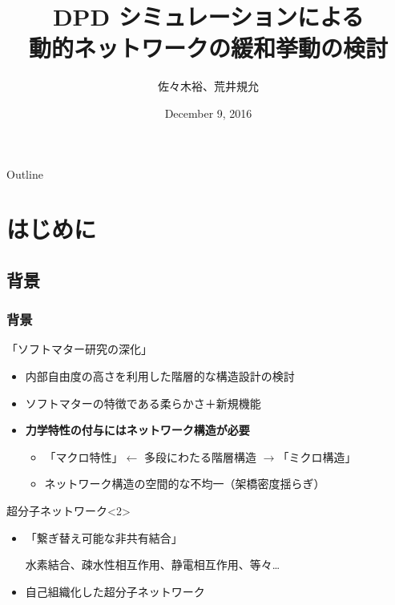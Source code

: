 \documentclass[12pt, dvipdfmx]{beamer}
\title
[DPD シミュレーションによる動的ネットワークの緩和挙動の検討]
{DPD シミュレーションによる\\動的ネットワークの緩和挙動の検討}
\author[東亞合成 佐々木 近畿大学 荒井]{佐々木裕、荒井規允}
\institute[東亞合成。近畿大学]{東亞合成、近畿大学}
\date{December 9, 2016}
\begin{document}
\begin{frame}\frametitle{}
	\titlepage
\end{frame}

\section*{}
%
\begin{frame}
{Outline}
	\tableofcontents
\end{frame}

\section{はじめに}

\subsection{背景}
\begin{frame}
\frametitle{背景}

\begin{block}{「ソフトマター研究の深化」}
	\begin{itemize}
	\item
	内部自由度の高さを利用した階層的な構造設計の検討
	\item
	ソフトマターの特徴である柔らかさ＋新規機能
	\item
	{\bf 力学特性の付与には\alert{ネットワーク構造}が必要}
		\begin{itemize}
		\item
		「マクロ特性」$\leftarrow$ 多段にわたる階層構造 $\rightarrow$「ミクロ構造」
		\item
		ネットワーク構造の空間的な不均一（架橋密度揺らぎ）
		\end{itemize}
	\end{itemize}
\end{block}

\begin{exampleblock}{超分子ネットワーク}<2>
	\begin{itemize}
	\item
	「繋ぎ替え可能な非共有結合」

	水素結合、疎水性相互作用、静電相互作用、等々…

	\item
	自己組織化した超分子ネットワーク
	\end{itemize}
\end{exampleblock}

\end{frame}
\end{document}

